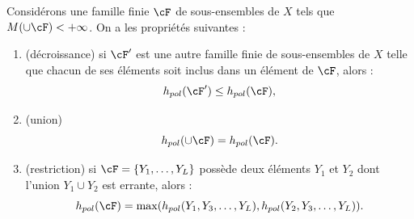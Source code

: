 \begin{lemm}\label{lemm.add-mon}
Considérons une famille finie $\cF$ de sous-ensembles de $X$ tels que $M(\cup\cF) < +\infty$. On a les propriétés suivantes :
\begin{enumerate}
\item \label{2.2.1} (décroissance) si $\cF'$ est une autre famille finie de sous-ensembles de $X$ telle que chacun de ses éléments soit inclus dans un élément de $\cF$, alors :
\[
h_{pol}(\cF') \leq h_{pol}(\cF),
\]
\item \label{2.2.2} (union)
\[
h_{pol}(\cup \cF) = h_{pol}(\cF).
\]
\item \label{2.2.3} (restriction) si $\cF=\{Y_1, \dots, Y_L \}$ possède deux éléments $Y_1$ et $Y_2$ dont l'union $Y_{1} \cup Y_2$ est errante, alors :
\[
h_{pol}(\cF) = \max(h_{pol}(Y_{1},Y_3, \dots, Y_{L}), h_{pol}(Y_{2},Y_3, \dots, Y_{L})).
\]
\end{enumerate}
\end{lemm}

